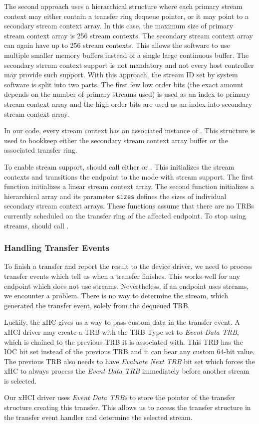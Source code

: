 The second approach uses a hierarchical structure where each primary stream
context may either contain a transfer ring dequeue pointer, or it may point to
a secondary stream context array. In this case, the maximum size of primary
stream context array is 256 stream contexts. The secondary stream context array
can again have up to 256 stream contexts. This allows the software to use
multiple smaller memory buffers instead of a single large continuous buffer. The
secondary stream context support is not mandatory and not every host controller
may provide such support. With this approach, the stream ID set by system
software is split into two parts. The first few low order bits (the exact
amount depends on the number of primary streams used) is used as an index to
primary stream context array and the high order bits are used as an index into
secondary stream context array.

In our code, every stream context has an associated instance of
. This structure is used to bookkeep either the
secondary stream context array buffer or the associated transfer ring.

To enable stream support,  should call either
 or
. This initializes the stream
contexts and transitions the endpoint to the mode with stream support. The
first function initializes a linear stream context array. The second function
initializes a hierarchical array and its parameter \texttt{sizes} defines the
sizes of individual secondary stream context arrays. These functions assume
that there are no TRBs currently scheduled on the transfer ring of the affected
endpoint. To stop using streams,  should call
.

\subsubsection{Handling Transfer Events}

To finish a transfer and report the result to the device driver, we need to
process transfer events which tell us when a transfer finishes. This works well
for any endpoint which does not use streams. Nevertheless, if an endpoint uses
streams, we encounter a problem. There is no way to determine the stream, which
generated the transfer event, solely from the dequeued TRB.

Luckily, the xHC gives us a way to pass custom data in the transfer event.
A xHCI driver may create a TRB with the TRB Type set to
\textit{Event Data TRB}, which is chained to the previous TRB it is associated
with. This TRB has the IOC bit set instead of the previous TRB and it can bear
any custom 64-bit value. The previous TRB also needs to have
\textit{Evaluate Next TRB} bit set which forces the xHC to always process the
\textit{Event Data TRB} immediately before another stream is selected.

Our xHCI driver uses \textit{Event Data TRBs} to store the pointer of the transfer
structure creating this transfer. This allows us to access the transfer
structure in the transfer event handler and determine the selected stream.
